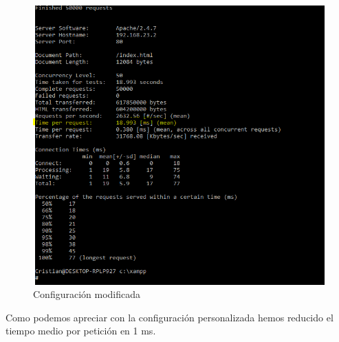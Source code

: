 \begin{enumerate}[label=(\alph*)]
\begin{itemize}
		\begin{figure}[H] %
		\centering
		\includegraphics[scale=0.5]{pics/14}  %
		\caption{Configuración modificada} \label{fig:8}
	\end{figure}
	
\end{itemize}

Como podemos apreciar con la configuración personalizada hemos reducido el tiempo medio por petición en 1 ms.

\end{enumerate}





\grid
